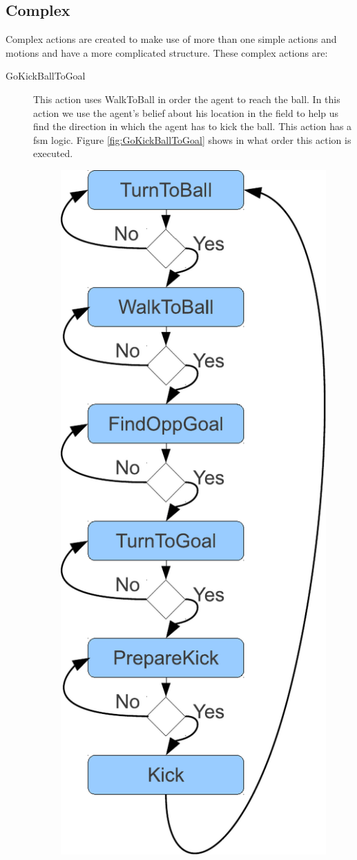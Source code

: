 \subsection{Complex}
Complex actions are created to make use of more than one simple actions and motions and have a more complicated structure. These complex actions are:
\begin{description}
 \item[GoKickBallToGoal] This action uses WalkToBall in order the agent to reach the ball. In this action we use the agent's belief about his location in the field to help us find the direction in which the agent has to kick the ball. This action has a fsm logic. Figure \ref{fig:GoKickBallToGoal} shows in what order this action is executed.
 \begin{figure}[!h]
\centering
  \includegraphics[scale=0.5]{Chapter3/figures/KickFSM.pdf}

\end{figure}
\end{description}
